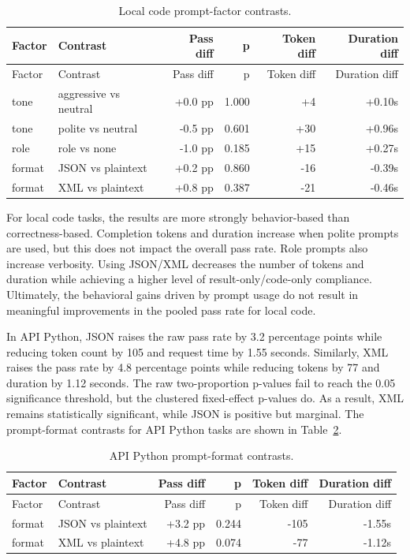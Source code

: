 \begin{longtable}[]{@{}llrrrr@{}}
\caption{Local code prompt-factor contrasts.}\label{tab:local-code-contrasts}\tabularnewline
\toprule\noalign{}
Factor & Contrast & Pass diff & p & Token diff & Duration diff \\
\midrule\noalign{}
\endfirsthead
\toprule\noalign{}
Factor & Contrast & Pass diff & p & Token diff & Duration diff \\
\midrule\noalign{}
\endhead
\bottomrule\noalign{}
\endlastfoot
tone & aggressive vs neutral & +0.0 pp & 1.000 & +4 & +0.10s \\
tone & polite vs neutral & -0.5 pp & 0.601 & +30 & +0.96s \\
role & role vs none & -1.0 pp & 0.185 & +15 & +0.27s \\
format & JSON vs plaintext & +0.2 pp & 0.860 & -16 & -0.39s \\
format & XML vs plaintext & +0.8 pp & 0.387 & -21 & -0.46s \\
\end{longtable}

For local code tasks, the results are more strongly behavior-based than correctness-based. Completion tokens and duration increase when polite prompts are used, but this does not impact the overall pass rate. Role prompts also increase verbosity. Using JSON/XML decreases the number of tokens and duration while achieving a higher level of result-only/code-only compliance. Ultimately, the behavioral gains driven by prompt usage do not result in meaningful improvements in the pooled pass rate for local code.

In API Python, JSON raises the raw pass rate by 3.2 percentage points while reducing token count by 105 and request time by 1.55 seconds. Similarly, XML raises the pass rate by 4.8 percentage points while reducing tokens by 77 and duration by 1.12 seconds. The raw two-proportion p-values fail to reach the 0.05 significance threshold, but the clustered fixed-effect p-values do. As a result, XML remains statistically significant, while JSON is positive but marginal. The prompt-format contrasts for API Python tasks are shown in Table~\ref{tab:api-python-contrasts}.

\begin{longtable}[]{@{}llrrrr@{}}
\caption{API Python prompt-format contrasts.}\label{tab:api-python-contrasts}\tabularnewline
\toprule\noalign{}
Factor & Contrast & Pass diff & p & Token diff & Duration diff \\
\midrule\noalign{}
\endfirsthead
\toprule\noalign{}
Factor & Contrast & Pass diff & p & Token diff & Duration diff \\
\midrule\noalign{}
\endhead
\bottomrule\noalign{}
\endlastfoot
format & JSON vs plaintext & +3.2 pp & 0.244 & -105 & -1.55s \\
format & XML vs plaintext & +4.8 pp & 0.074 & -77 & -1.12s \\
\end{longtable}

